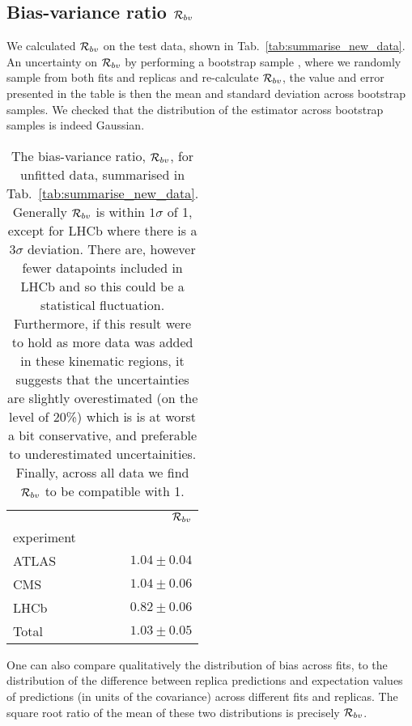 \subsection{Bias-variance ratio $\mathcal{R}_{bv}$}

We calculated $\mathcal{R}_{bv}$ on the test data, shown in
Tab.~\ref{tab:summarise_new_data}. An
uncertainty on $\mathcal{R}_{bv}$ by performing a bootstrap sample
\cite{efron1994introduction},
where we randomly sample from both fits and replicas and re-calculate
$\mathcal{R}_{bv}$, the value and error presented in the table is then the mean
and standard deviation across bootstrap samples. We checked that the distribution
of the estimator across bootstrap samples is indeed Gaussian.

\begin{table}
    \begin{center}
        \begin{tabular}{lr}
            \toprule
            {} &  $\mathcal{R}_{bv}$ \\
            experiment &                      \\
            \midrule
            ATLAS       &                 $1.04 \pm 0.04$  \\
            CMS         &                 $1.04 \pm 0.06$ \\
            LHCb       &                 $0.82 \pm 0.06$ \\
            Total       &                 $ 1.03 \pm 0.05$ \\
            \bottomrule
        \end{tabular}
    \end{center}
    \caption{
        The bias-variance ratio, $\mathcal{R}_{bv}$, for unfitted data, summarised in
        Tab.~\ref{tab:summarise_new_data}. Generally $\mathcal{R}_{bv}$ is within
        $1\sigma$ of 1, except for LHCb where there is a $3\sigma$ deviation.
        There are, however fewer datapoints included in LHCb and so this could be
        a statistical fluctuation. Furthermore, if this result were to hold as
        more data was added in these kinematic regions, it suggests that the
        uncertainties are slightly overestimated (on the level of 20\%) which is
        is at worst a bit conservative, and preferable to underestimated
        uncertainities. Finally, across all data we find $\mathcal{R}_{bv}$ to
        be compatible with 1.
    }
    \label{tab:biasvarratio}
\end{table}

One can also compare qualitatively the distribution of bias across fits, to the
distribution of the difference between replica predictions and expectation
values of predictions (in units of the covariance) across different fits
and replicas. The square root ratio of the mean of these two distributions
is precisely $\mathcal{R}_{bv}$.

